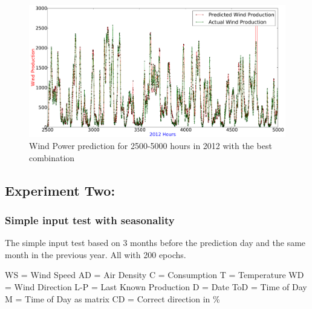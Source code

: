 \begin{figure}
\centering
\includegraphics[width=0.99\linewidth]{billeder/bestInputCombi2500-5000.png}
\caption{Wind Power prediction for 2500-5000 hours in 2012 with the best combination}
\label{fig:bestInputCombi2500-5000}
\end{figure} 

\subsection{Experiment Two:}

\subsubsection{Simple input test with seasonality}
\label{sec:simpleInputTestSeason}
The simple input test based on 3 months before the prediction day and the same month in the previous year. All with 200 epochs.

WS = Wind Speed
AD = Air Density
C = Consumption
T = Temperature
WD = Wind Direction
L-P = Last Known Production
D = Date
ToD = Time of Day
M = Time of Day as matrix
CD = Correct direction in \%

